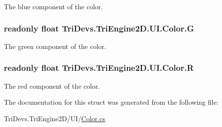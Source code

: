 The blue component of the color. 

\hypertarget{struct_tri_devs_1_1_tri_engine2_d_1_1_u_i_1_1_color_a62e164ea8c88b08b85de9bd80e9e33f1}{
\subsubsection[{G}]{\setlength{\rightskip}{0pt plus 5cm}readonly float Tri\-Devs.\-Tri\-Engine2\-D.\-U\-I.\-Color.\-G}}\label{struct_tri_devs_1_1_tri_engine2_d_1_1_u_i_1_1_color_a62e164ea8c88b08b85de9bd80e9e33f1}


The green component of the color. 

\hypertarget{struct_tri_devs_1_1_tri_engine2_d_1_1_u_i_1_1_color_aa7c3ba09deebad2300f0d29b8e8c281d}{
\subsubsection[{R}]{\setlength{\rightskip}{0pt plus 5cm}readonly float Tri\-Devs.\-Tri\-Engine2\-D.\-U\-I.\-Color.\-R}}\label{struct_tri_devs_1_1_tri_engine2_d_1_1_u_i_1_1_color_aa7c3ba09deebad2300f0d29b8e8c281d}


The red component of the color. 



The documentation for this struct was generated from the following file\-:\begin{DoxyCompactItemize}
\item 
Tri\-Devs.\-Tri\-Engine2\-D/\-U\-I/\hyperlink{_color_8cs}{Color.\-cs}\end{DoxyCompactItemize}
